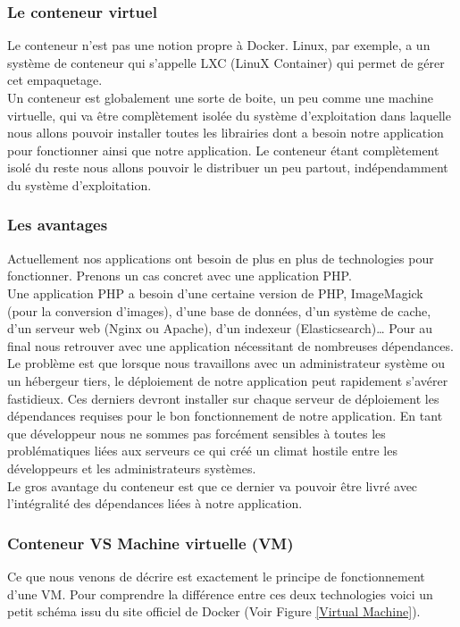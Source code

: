       \subsubsection{Le conteneur virtuel}
      Le conteneur n’est pas une notion propre à Docker. Linux, par exemple, a un système de conteneur qui s’appelle LXC (LinuX Container) qui permet de gérer cet empaquetage.\\

      Un conteneur est globalement une sorte de boite, un peu comme une machine virtuelle, qui va être complètement isolée du système d’exploitation dans laquelle nous allons pouvoir installer toutes les librairies dont a besoin notre application pour fonctionner ainsi que notre application. Le conteneur étant complètement isolé du reste nous allons pouvoir le distribuer un peu partout, indépendamment du système d’exploitation.

      \subsubsection{Les avantages}
      Actuellement nos applications ont besoin de plus en plus de technologies pour fonctionner. Prenons un cas concret avec une application PHP.\\

      Une application PHP a besoin d’une certaine version de PHP, ImageMagick (pour la conversion d’images), d’une base de données, d’un système de cache, d’un serveur web (Nginx ou Apache), d’un indexeur (Elasticsearch)… Pour au final nous retrouver avec une application nécessitant de nombreuses dépendances.\\

      Le problème est que lorsque nous travaillons avec un administrateur système ou un hébergeur tiers, le déploiement de notre application peut rapidement s’avérer fastidieux. Ces derniers devront installer sur chaque serveur de déploiement les dépendances requises pour le bon fonctionnement de notre application. En tant que développeur nous ne sommes pas forcément sensibles à toutes les problématiques liées aux serveurs ce qui créé un climat hostile entre les développeurs et les administrateurs systèmes.\\

      Le gros avantage du conteneur est que ce dernier va pouvoir être livré avec l’intégralité des dépendances liées à notre application.

      \subsubsection{Conteneur VS Machine virtuelle (VM)}
      Ce que nous venons de décrire est exactement le principe de fonctionnement d’une VM. Pour comprendre la différence entre ces deux technologies voici un petit schéma issu du site officiel de Docker (Voir Figure \ref{Virtual Machine}).\\

